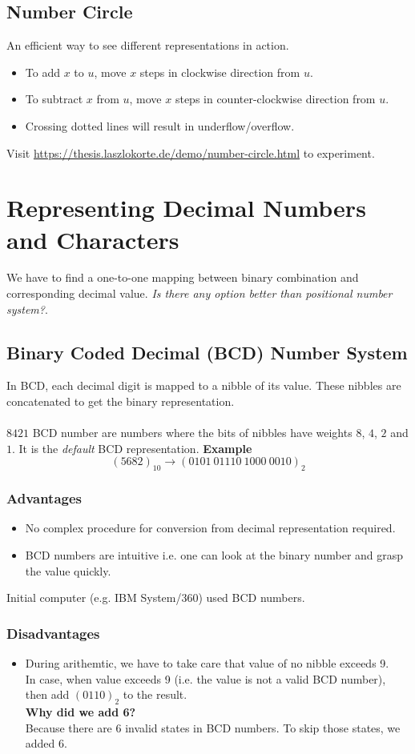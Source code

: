 \documentclass[oneside]{book}
\begin{document}
\subsection{Number Circle}
An efficient way to see different representations in action.
\begin{itemize}
	\item To add \(x\) to \(u\), move \(x\) steps in clockwise direction from \(u\).
	\item To subtract \(x\) from \(u\), move \(x\) steps in counter-clockwise direction from \(u\).
	\item Crossing dotted lines will result in underflow/overflow.
\end{itemize}
Visit \url{https://thesis.laszlokorte.de/demo/number-circle.html} to experiment.

\section{Representing Decimal Numbers and Characters}
We have to find a one-to-one mapping between binary combination and corresponding decimal value. \textit{Is there any option better than positional number system?}.
\subsection{Binary Coded Decimal (BCD) Number System}
In BCD, each decimal digit is mapped to a nibble of its value. These nibbles are concatenated to get the binary representation.
\\\\
\noindent \(8421\) BCD number are numbers where the bits of nibbles have weights \(8\), \(4\), \(2\) and \(1\). It is the \textit{default} BCD representation.
\textbf{Example}
\[
	(5682)_{10} \longrightarrow (0101\ 01110\ 1000\ 0010)_2
\]
\subsubsection{Advantages}
\begin{itemize}
	\item No complex procedure for conversion from decimal representation required.
	\item BCD numbers are intuitive i.e. one can look at the binary number and grasp the value quickly.
\end{itemize}
Initial computer (e.g. IBM System/360) used BCD numbers.
\subsubsection{Disadvantages}
\begin{itemize}
	\item During arithemtic, we have to take care that value of no nibble exceeds 9.\\
	      In case, when value exceeds 9 (i.e. the value is not a valid BCD number), then add \((0110)_2\) to the result.\\
	      \textbf{Why did we add 6?}\\
	      \cite{bcd_addition_overflow} Because there are 6 invalid states in BCD numbers. To skip those states, we added 6.
\end{itemize}
\end{document}
